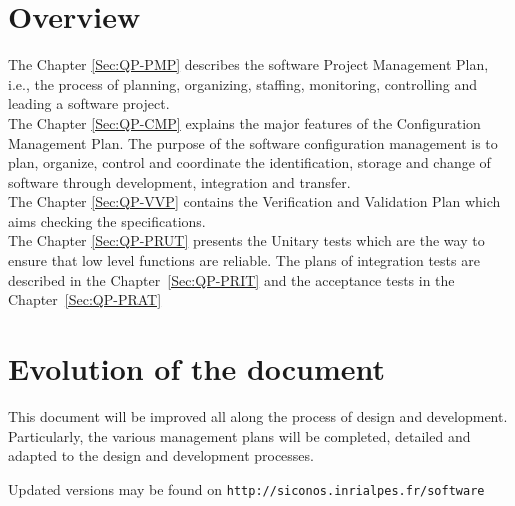 \section{Overview}

The Chapter \ref{Sec:QP-PMP} describes the software Project Management Plan, i.e., the process of planning, organizing, staffing, monitoring,
controlling and leading a software project.\\
The Chapter \ref{Sec:QP-CMP} explains the major features of the Configuration Management Plan.
The purpose of the software configuration management is to plan, organize, control and coordinate the identification, storage and change
of software through development, integration and transfer.\\
The Chapter \ref{Sec:QP-VVP} contains the Verification and Validation Plan which aims checking the specifications.\\
The Chapter \ref{Sec:QP-PRUT} presents the Unitary tests which are the way to ensure that low level functions are reliable. The plans of integration tests are described in the Chapter~\ref{Sec:QP-PRIT} and the acceptance tests in the Chapter~\ref{Sec:QP-PRAT}


\section{Evolution of the document}

This document will  be improved all along the process of design and development. Particularly, the various management plans will be completed, detailed and adapted to the design and development processes.


 Updated versions may be found on \texttt{http://siconos.inrialpes.fr/software}  
